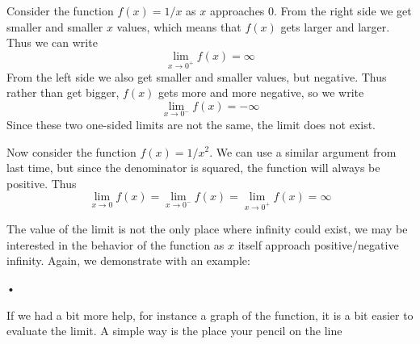 \begin{example}
	Consider the function $f(x) = 1/x$ as $x$ approaches 0. From the right side we get smaller and smaller $x$ values, which means that $f(x)$ gets larger and larger. Thus we can write
	\[ \lim_{x \to 0^+} f(x) = \infty \]
	From the left side we also get smaller and smaller values, but negative. Thus rather than get bigger, $f(x)$ gets more and more negative, so we write
	\[ \lim_{x \to 0^-} f(x) = -\infty \]
	Since these two one-sided limits are not the same, the limit does not exist.
\end{example}

\begin{example}
	Now consider the function $f(x) = 1/x^2$. We can use a similar argument from last time, but since the denominator is squared, the function will always be positive. Thus
	\[ \lim_{x \to 0} f(x) = \lim_{x \to 0^-} f(x) = \lim_{x \to 0^+} f(x) = \infty \]
\end{example}

The value of the limit is not the only place where infinity could exist, we may be interested in the behavior of the function as $x$ itself approach positive/negative infinity. Again, we demonstrate with an example:

\begin{example}
	•
\end{example}


If we had a bit more help, for instance a graph of the function, it is a bit easier to evaluate the limit. A simple way is the place your pencil on the line 


